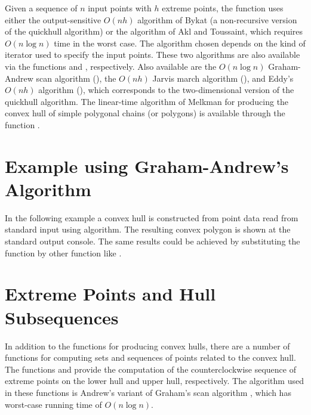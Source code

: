 Given a sequence of $n$ input points with $h$ extreme points,
the function 
uses either the output-sensitive $O(n h)$ algorithm of Bykat \cite{b-chfsp-78}
(a non-recursive version of the quickhull \cite{bdh-qach-96} algorithm)%
or the algorithm of Akl and Toussaint, which requires $O(n \log n)$ time
in the worst case.  The algorithm chosen depends on the kind of 
iterator used to specify the input points.  These two algorithms are
also available via the functions  and ,
respectively.  Also available are 
the $O(n \log n)$ Graham-Andrew scan algorithm \cite{a-aeach-79,m-mdscg-84} 
(), 
the $O(n h)$ Jarvis march algorithm \cite{j-ichfs-73}
(),
and Eddy's $O(n h)$ algorithm \cite{e-nchap-77}
(), which corresponds to the 
two-dimensional version of the quickhull algorithm.
The linear-time algorithm of Melkman for producing the convex hull of 
simple polygonal chains (or polygons) is available through the function
.%

\section{Example using Graham-Andrew's Algorithm}

In the following example a convex hull is constructed from point data read 
from standard input using  algorithm. The resulting convex 
polygon is shown at the standard output console. The same results could be 
achieved by substituting the function  by other 
function like .



\section{Extreme Points and Hull Subsequences}
In addition to the functions for producing convex hulls, there are a
number of functions for computing sets and sequences of points related
to the convex hull.  
The functions 
and 
provide the computation of the counterclockwise 
sequence of extreme points on the lower hull and upper hull,
respectively.  The algorithm used in these functions is
Andrew's variant of Graham's scan algorithm \cite{a-aeach-79,m-mdscg-84},
which has worst-case running time of $O(n \log n)$.

